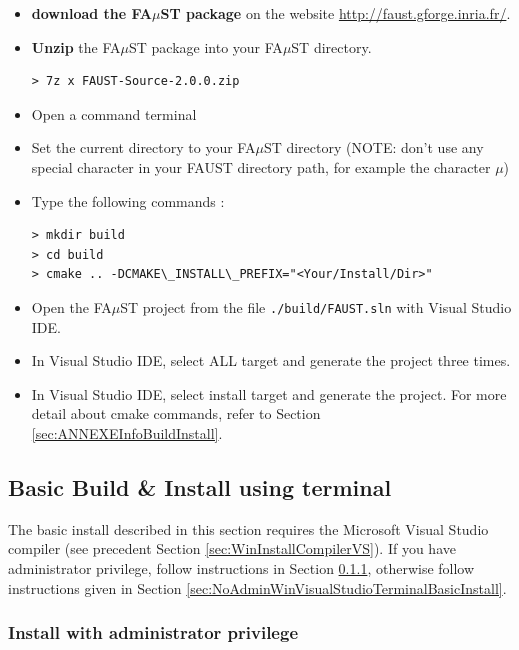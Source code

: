 \begin{itemize}
\item \textbf{download the FA$\mu$ST package} on the website  \url{http://faust.gforge.inria.fr/}. 
\item \textbf{Unzip} the FA$\mu$ST package into your FA$\mu$ST directory. 
\begin{lstlisting}
> 7z x FAUST-Source-2.0.0.zip
\end{lstlisting}
\item Open a command terminal
\item Set the current directory to your FA$\mu$ST directory (NOTE: don't use any special character in your FAUST directory path, for example the character $\mu$)
\item Type the following commands : 
\begin{lstlisting}
> mkdir build
> cd build
> cmake .. -DCMAKE\_INSTALL\_PREFIX="<Your/Install/Dir>"
\end{lstlisting}
\item Open the FA$\mu$ST project from the file \texttt{./build/FAUST.sln} with Visual Studio IDE.
\item In Visual Studio IDE, select ALL target and generate the project three times.
\item In Visual Studio IDE, select install target and generate the project.
For more detail about cmake commands, refer to Section \ref{sec:ANNEXEInfoBuildInstall}.

\end{itemize}

\subsection{Basic Build \& Install using terminal}\label{sec:WinVisualStudioTerminalBasicInstall}
The basic install described in this section requires the Microsoft Visual Studio compiler (see precedent Section \ref{sec:WinInstallCompilerVS}).
If you have administrator privilege, follow instructions in Section \ref{sec:AdminWinVisualStudioTerminalBasicInstall}, otherwise follow instructions given in Section \ref{sec:NoAdminWinVisualStudioTerminalBasicInstall}.

\subsubsection{Install with administrator privilege}
\label{sec:AdminWinVisualStudioTerminalBasicInstall}


